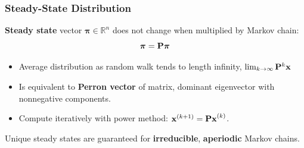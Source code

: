 \documentclass{beamer}
\begin{document}
\begin{frame}
\frametitle{Steady-State Distribution}

\begin{block}{}
\textbf{Steady state} vector $\boldsymbol{\pi} \in \mathbb{R}^n$ does not change when multiplied by Markov chain:
\[ \boldsymbol{\pi} = {\bf P} \boldsymbol{\pi} \]
\end{block}

\begin{itemize}
\item Average distribution as random walk tends to length infinity, $\lim_{k\to\infty} {\bf P}^k{\bf x}$
\item Is equivalent to \textbf{Perron vector} of matrix, dominant eigenvector with nonnegative components.
\item Compute iteratively with power method: ${\bf x}^{(k+1) } = {\bf Px}^{(k)}$.
\end{itemize}

\begin{block}{}
Unique steady states are guaranteed for \textbf{irreducible}, \textbf{aperiodic} Markov chains.
\end{block}

\end{frame}
\end{document}
